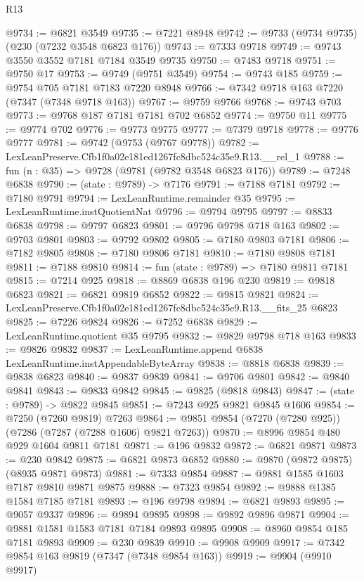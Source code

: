 \begin{lexlean}{R13}
\begin{coremodule}
@9734 := @6821 @3549
@9735 := @7221 @8948
@9742 := @9733 (@9734 @9735) (@230 (@7232 @3548 @6823 @176))
@9743 := @7333 @9718
@9749 := @9743 @3550 @3552 @7181 @7184 @3549 @9735
@9750 := @7483 @9718
@9751 := @9750 @17
@9753 := @9749 (@9751 @3549)
@9754 := @9743 @185
@9759 := @9754 @705 @7181 @7183 @7220 @8948
@9766 := @7342 @9718 @163 @7220 (@7347 (@7348 @9718 @163))
@9767 := @9759 @9766
@9768 := @9743 @703
@9773 := @9768 @187 @7181 @7181 @702 @6852
@9774 := @9750 @11
@9775 := @9774 @702
@9776 := @9773 @9775
@9777 := @7379 @9718
@9778 := @9776 @9777
@9781 := @9742 (@9753 (@9767 @9778))
@9782 := LexLeanPreserve.Cfb1f0a02e181ed1267fc8dbc524c35e9.R13.__rel_1
@9788 := fun (n : @35) => @9728 (@9781 (@9782 @3548 @6823 @176))
@9789 := @7248 @6838
@9790 := (state : @9789) -> @7176
@9791 := @7188 @7181
@9792 := @7180 @9791
@9794 := LexLeanRuntime.remainder @35
@9795 := LexLeanRuntime.instQuotientNat
@9796 := @9794 @9795
@9797 := @8833 @6838
@9798 := @9797 @6823
@9801 := @9796 @9798 @718 @163
@9802 := @9703 @9801
@9803 := @9792 @9802
@9805 := @7180 @9803 @7181
@9806 := @7182 @9805
@9808 := @7180 @9806 @7181
@9810 := @7180 @9808 @7181
@9811 := @7188 @9810
@9814 := fun (state : @9789) => @7180 @9811 @7181
@9815 := @7214 @925
@9818 := @8869 @6838 @196 @230
@9819 := @9818 @6823
@9821 := @6821 @9819 @6852
@9822 := @9815 @9821
@9824 := LexLeanPreserve.Cfb1f0a02e181ed1267fc8dbc524c35e9.R13.__fits_25 @6823
@9825 := @7226 @9824
@9826 := @7252 @6838
@9829 := LexLeanRuntime.quotient @35 @9795
@9832 := @9829 @9798 @718 @163
@9833 := @9826 @9832
@9837 := LexLeanRuntime.append @6838 LexLeanRuntime.instAppendableByteArray
@9838 := @8818 @6838
@9839 := @9838 @6823
@9840 := @9837 @9839
@9841 := @9706 @9801
@9842 := @9840 @9841
@9843 := @9833 @9842
@9845 := @9825 (@9818 @9843)
@9847 := (state : @9789) -> @9822 @9845
@9851 := @7243 @925 @9821 @9845 @1606
@9854 := @7250 (@7260 @9819) @7263
@9864 := @9851 @9854 (@7270 (@7280 @925)) (@7286 (@7287 (@7288 @1606) @9821 @7263))
@9870 := @8996 @9854 @480 @929 @1604 @9811 @7181
@9871 := @196 @9832
@9872 := @6821 @9871
@9873 := @230 @9842
@9875 := @6821 @9873 @6852
@9880 := @9870 (@9872 @9875) (@8935 @9871 @9873)
@9881 := @7333 @9854
@9887 := @9881 @1585 @1603 @7187 @9810 @9871 @9875
@9888 := @7323 @9854
@9892 := @9888 @1385 @1584 @7185 @7181
@9893 := @196 @9798
@9894 := @6821 @9893
@9895 := @9057 @9337
@9896 := @9894 @9895
@9898 := @9892 @9896 @9871
@9904 := @9881 @1581 @1583 @7181 @7184 @9893 @9895
@9908 := @8960 @9854 @185 @7181 @9893
@9909 := @230 @9839
@9910 := @9908 @9909
@9917 := @7342 @9854 @163 @9819 (@7347 (@7348 @9854 @163))
@9919 := @9904 (@9910 @9917)

\end{coremodule}
\end{lexlean}
